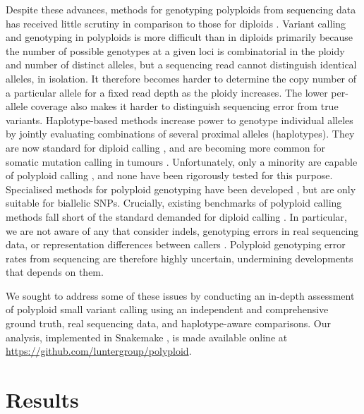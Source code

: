 \documentclass[notitlepage, twocolumn, 10pt]{article}
\begin{document}
Despite these advances, methods for genotyping polyploids from sequencing data has received little scrutiny in comparison to those for diploids \cite{RN677, RN651, RN605, RN675}. Variant calling and genotyping in polyploids is more difficult than in diploids primarily because the number of possible genotypes at a given loci is combinatorial in the ploidy and number of distinct alleles, but a sequencing read cannot distinguish identical alleles, in isolation. It therefore becomes harder to determine the copy number of a particular allele for a fixed read depth as the ploidy increases. The lower per-allele coverage also makes it harder to distinguish sequencing error from true variants. Haplotype-based methods increase  power to genotype individual alleles by jointly evaluating combinations of several proximal alleles (haplotypes). They are now standard for diploid calling \cite{RN663, RN598, RN538, RN604, RN619, RN5}, and are becoming more common for somatic mutation calling in tumours \cite{RN663}. Unfortunately, only a minority are capable of polyploid calling \cite{RN663, RN598, RN538}, and none have been rigorously tested for this purpose. Specialised methods for polyploid genotyping have been developed \cite{RN666, RN662, RN674}, but are only suitable for biallelic SNPs. Crucially, existing benchmarks of polyploid calling methods fall short of the standard demanded for diploid calling \cite{RN678, RN655, RN656, RN675}. In particular, we are not aware of any that consider indels, genotyping errors in real sequencing data, or representation differences between callers \cite{RN675}. Polyploid genotyping error rates from sequencing are therefore highly uncertain, undermining developments that depends on them.

We sought to address some of these issues by conducting an in-depth assessment of polyploid small variant calling using an independent and comprehensive ground truth, real sequencing data, and haplotype-aware comparisons. Our analysis, implemented in Snakemake \cite{RN756}, is made available online at \url{https://github.com/luntergroup/polyploid}.

\section*{Results}
\end{document}
